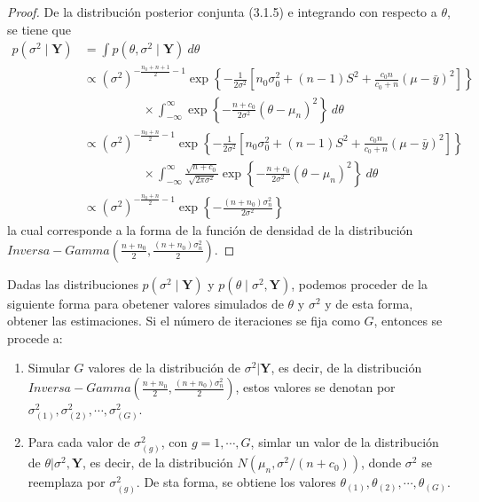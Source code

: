 \begin{proof}
De la distribución posterior conjunta (3.1.5) e integrando con respecto a $\theta$, se tiene que
\begin{align*}
p(\sigma^2 \mid \mathbf{Y})&=\int p(\theta,\sigma^2 \mid \mathbf{Y}) \ d\theta\\
&\propto (\sigma^2)^{-\frac{n_0+n+1}{2}-1}
\exp\left\{-\frac{1}{2\sigma^2}\left[n_0\sigma^2_0+(n-1)S^2+\frac{c_0n}{c_0+n}(\mu-\bar{y})^2\right]\right\}\\
&\hspace{2cm}\times
\int_{-\infty}^{\infty}\exp\left\{-\frac{n+c_0}{2\sigma^2}(\theta-\mu_n)^2\right\} \ d\theta\\
&\propto (\sigma^2)^{-\frac{n_0+n}{2}-1}
\exp\left\{-\frac{1}{2\sigma^2}\left[n_0\sigma^2_0+(n-1)S^2+\frac{c_0n}{c_0+n}(\mu-\bar{y})^2\right]\right\}\\
&\hspace{2cm}\times
\int_{-\infty}^{\infty}\frac{\sqrt{n+c_0}}{\sqrt{2\pi\sigma^2}}
\exp\left\{-\frac{n+c_0}{2\sigma^2}(\theta-\mu_n)^2\right\} \ d\theta\\
&\propto (\sigma^2)^{-\frac{n_0+n}{2}-1}
\exp\left\{-\frac{(n+n_0)\sigma^2_n}{2\sigma^2}\right\}
\end{align*}
la cual corresponde a la forma de la función de densidad de la distribución $Inversa-Gamma(\frac{n+n_0}{2},\frac{(n+n_0)\sigma^2_n}{2})$.
\end{proof}

Dadas las distribuciones $p(\sigma^2\mid \mathbf{Y})$ y $p(\theta\mid \sigma^2, \mathbf{Y})$, podemos proceder de la siguiente forma para obetener valores simulados de $\theta$ y $\sigma^2$ y de esta forma, obtener las estimaciones. Si el número de iteraciones se fija como $G$, entonces se procede a:

\begin{enumerate}[(1)]
\item Simular $G$ valores de la distribución de $\sigma^2|\mathbf{Y}$, es decir, de la distribución $Inversa-Gamma(\frac{n+n_0}{2},\frac{(n+n_0)\sigma^2_n}{2})$, estos valores se denotan por $\sigma^2_{(1)},\sigma^2_{(2)},\cdots,\sigma^2_{(G)}$.
\item  Para cada valor de $\sigma^2_{(g)}$, con $g=1,\cdots,G$, simlar un valor de la distribución de $\theta|\sigma^2,\mathbf{Y}$, es decir, de la distribución $N(\mu_n,\sigma^2/(n+c_0))$, donde $\sigma^2$ se reemplaza por $\sigma^2_{(g)}$. De sta forma, se obtiene los valores $\theta_{(1)},\theta_{(2)},\cdots,\theta_{(G)}$.
\end{enumerate}


